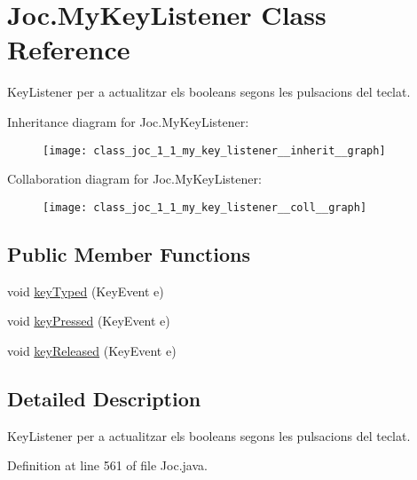 \hypertarget{class_joc_1_1_my_key_listener}{}\section{Joc.\+My\+Key\+Listener Class Reference}
\label{class_joc_1_1_my_key_listener}


Key\+Listener per a actualitzar els booleans segons les pulsacions del teclat.  




Inheritance diagram for Joc.\+My\+Key\+Listener\+:\nopagebreak
\begin{figure}[H]
\begin{center}
\leavevmode
\texttt{[image: class\_joc\_1\_1\_my\_key\_listener\_\_inherit\_\_graph]}
\end{center}
\end{figure}


Collaboration diagram for Joc.\+My\+Key\+Listener\+:\nopagebreak
\begin{figure}[H]
\begin{center}
\leavevmode
\texttt{[image: class\_joc\_1\_1\_my\_key\_listener\_\_coll\_\_graph]}
\end{center}
\end{figure}
\subsection*{Public Member Functions}
\begin{DoxyCompactItemize}
\item 
void \hyperlink{class_joc_1_1_my_key_listener_a4ca06e4f3950c3745be88c484f12df85}{key\+Typed} (Key\+Event e)
\item 
void \hyperlink{class_joc_1_1_my_key_listener_a14addef50fc960bcd8e4ce5cc3d9c643}{key\+Pressed} (Key\+Event e)
\item 
void \hyperlink{class_joc_1_1_my_key_listener_af5f550e0c17018b1bce4648782aaa9fb}{key\+Released} (Key\+Event e)
\end{DoxyCompactItemize}


\subsection{Detailed Description}
Key\+Listener per a actualitzar els booleans segons les pulsacions del teclat. 

Definition at line 561 of file Joc.\+java.



